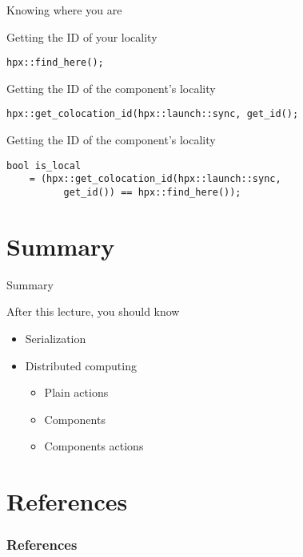 \documentclass[\classoption]{beamer}
\begin{document}
\begin{frame}[fragile]{Knowing where you are}

\begin{block}{Getting the ID of your locality}
\begin{lstlisting}
hpx::find_here();
\end{lstlisting}
\end{block}

\begin{block}{Getting the ID of the component's locality}
\begin{lstlisting}
hpx::get_colocation_id(hpx::launch::sync, get_id();
\end{lstlisting}
\end{block}

\begin{block}{Getting the ID of the component's locality}
\begin{lstlisting}
bool is_local 
    = (hpx::get_colocation_id(hpx::launch::sync, 
          get_id()) == hpx::find_here());
\end{lstlisting}
\end{block}

\end{frame}

\section{Summary}
\begin{frame}{Summary}
\begin{block}{After this lecture, you should know}
\begin{itemize}
\item Serialization
\item Distributed computing
\begin{itemize}
\item Plain actions
\item Components
\item Components actions
\end{itemize}
\end{itemize}
\end{block}
\end{frame}

\section{References}

\begin{frame}[t, allowframebreaks]
\frametitle{References}


\end{frame}
\end{document}
